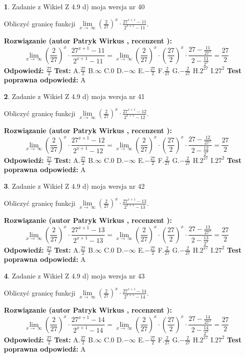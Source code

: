\documentclass[12pt, a4paper]{article}
\theoremstyle{definition} %
\newtheorem{zad}{}
\newcommand{\zadStart}[1]{\begin{zad}#1\newline}
\newcommand{\zadStop}{\end{zad}}
\newcommand{\rozwStart}[2]{\noindent \textbf{Rozwiązanie (autor #1 , recenzent #2): }\newline}
\newcommand{\rozwStop}{\newline}
\newcommand{\odpStart}{\noindent \textbf{Odpowiedź:}\newline}
\newcommand{\odpStop}{\newline}
\newcommand{\testStart}{\noindent \textbf{Test:}\newline}
\newcommand{\testStop}{\newline}
\newcommand{\kluczStart}{\noindent \textbf{Test poprawna odpowiedź:}\newline}
\newcommand{\kluczStop}{\newline}
\begin{document}
\zadStart{Zadanie z Wikieł Z 4.9 d) moja wersja nr 40}


Obliczyć granicę funkcji  $\lim\limits_{x\to\ \infty}(\frac{2}{27})^{x}\cdot\frac{27^{x+1}-11}{2^{x+1}-11}$.
\zadStop
\rozwStart{Patryk Wirkus}{}
$$\lim\limits_{x\to\ \infty}(\frac{2}{27})^{x}\cdot\frac{27^{x+1}-11}{2^{x+1}-11}=\lim\limits_{x\to\ \infty}(\frac{2}{27})^{x}\cdot(\frac{27}{2})^{x} \cdot \frac{27-\frac{11}{27^{x}}}{2-\frac{11}{2^{x}}} = \frac{27}{2}$$
\rozwStop
\odpStart
$\frac{27}{2}$
\odpStop
\testStart
A.$\frac{27}{2}$ B.$\infty$ C.$0$ D.$-\infty$ E.$-\frac{27}{2}$
F.$\frac{2}{27}$ G.$-\frac{2}{27}$
H.$2^{27}$
I.$27^{2}$
\testStop
\kluczStart
A
\kluczStop



\zadStart{Zadanie z Wikieł Z 4.9 d) moja wersja nr 41}


Obliczyć granicę funkcji  $\lim\limits_{x\to\ \infty}(\frac{2}{27})^{x}\cdot\frac{27^{x+1}-12}{2^{x+1}-12}$.
\zadStop
\rozwStart{Patryk Wirkus}{}
$$\lim\limits_{x\to\ \infty}(\frac{2}{27})^{x}\cdot\frac{27^{x+1}-12}{2^{x+1}-12}=\lim\limits_{x\to\ \infty}(\frac{2}{27})^{x}\cdot(\frac{27}{2})^{x} \cdot \frac{27-\frac{12}{27^{x}}}{2-\frac{12}{2^{x}}} = \frac{27}{2}$$
\rozwStop
\odpStart
$\frac{27}{2}$
\odpStop
\testStart
A.$\frac{27}{2}$ B.$\infty$ C.$0$ D.$-\infty$ E.$-\frac{27}{2}$
F.$\frac{2}{27}$ G.$-\frac{2}{27}$
H.$2^{27}$
I.$27^{2}$
\testStop
\kluczStart
A
\kluczStop



\zadStart{Zadanie z Wikieł Z 4.9 d) moja wersja nr 42}


Obliczyć granicę funkcji  $\lim\limits_{x\to\ \infty}(\frac{2}{27})^{x}\cdot\frac{27^{x+1}-13}{2^{x+1}-13}$.
\zadStop
\rozwStart{Patryk Wirkus}{}
$$\lim\limits_{x\to\ \infty}(\frac{2}{27})^{x}\cdot\frac{27^{x+1}-13}{2^{x+1}-13}=\lim\limits_{x\to\ \infty}(\frac{2}{27})^{x}\cdot(\frac{27}{2})^{x} \cdot \frac{27-\frac{13}{27^{x}}}{2-\frac{13}{2^{x}}} = \frac{27}{2}$$
\rozwStop
\odpStart
$\frac{27}{2}$
\odpStop
\testStart
A.$\frac{27}{2}$ B.$\infty$ C.$0$ D.$-\infty$ E.$-\frac{27}{2}$
F.$\frac{2}{27}$ G.$-\frac{2}{27}$
H.$2^{27}$
I.$27^{2}$
\testStop
\kluczStart
A
\kluczStop



\zadStart{Zadanie z Wikieł Z 4.9 d) moja wersja nr 43}


Obliczyć granicę funkcji  $\lim\limits_{x\to\ \infty}(\frac{2}{27})^{x}\cdot\frac{27^{x+1}-14}{2^{x+1}-14}$.
\zadStop
\rozwStart{Patryk Wirkus}{}
$$\lim\limits_{x\to\ \infty}(\frac{2}{27})^{x}\cdot\frac{27^{x+1}-14}{2^{x+1}-14}=\lim\limits_{x\to\ \infty}(\frac{2}{27})^{x}\cdot(\frac{27}{2})^{x} \cdot \frac{27-\frac{14}{27^{x}}}{2-\frac{14}{2^{x}}} = \frac{27}{2}$$
\rozwStop
\odpStart
$\frac{27}{2}$
\odpStop
\testStart
A.$\frac{27}{2}$ B.$\infty$ C.$0$ D.$-\infty$ E.$-\frac{27}{2}$
F.$\frac{2}{27}$ G.$-\frac{2}{27}$
H.$2^{27}$
I.$27^{2}$
\testStop
\kluczStart
A
\kluczStop
\end{document}
